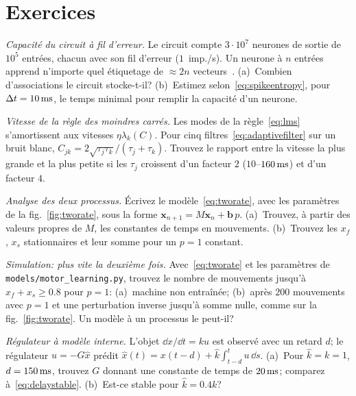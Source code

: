 \section{Exercices}

\begin{exercise}[\lvlA]
\label{ex:15:1}
\emph{Capacité du circuit à fil d'erreur.} Le circuit compte $3\cdot10^7$ neurones de sortie de $10^5$ entrées, chacun avec son fil d'erreur ($1$~imp./s). Un neurone à $n$ entrées apprend n'importe quel étiquetage de $\approx2n$ vecteurs~\cite{Cover1965}. (a)~Combien d'associations le circuit stocke-t-il? (b)~Estimez selon~\eqref{eq:spikeentropy}, pour $\Delta t=10\,\text{ms}$, le temps minimal pour remplir la capacité d'un neurone.
\end{exercise}

\begin{exercise}[\lvlB]
\label{ex:15:2}
\emph{Vitesse de la règle des moindres carrés.} Les modes de la règle~\eqref{eq:lms} s'amortissent aux vitesses $\eta\lambda_k(C)$. Pour cinq filtres~\eqref{eq:adaptivefilter} sur un bruit blanc, $C_{jk}=2\sqrt{\tau_j\tau_k}/(\tau_j+\tau_k)$. Trouvez le rapport entre la vitesse la plus grande et la plus petite si les $\tau_j$ croissent d'un facteur $2$ ($10$--$160\,\text{ms}$) et d'un facteur $4$.
\end{exercise}

\begin{exercise}[\lvlB]
\label{ex:15:3}
\emph{Analyse des deux processus.} Écrivez le modèle~\eqref{eq:tworate}, avec les paramètres de la fig.~\ref{fig:tworate}, sous la forme $\mathbf x_{n+1}=M\mathbf x_n+\mathbf b\,p$. (a)~Trouvez, à partir des valeurs propres de $M$, les constantes de temps en mouvements. (b)~Trouvez les $x_f$, $x_s$ stationnaires et leur somme pour un $p=1$ constant.
\end{exercise}

\begin{exercise}[\lvlB]
\label{ex:15:4}
\emph{Simulation: plus vite la deuxième fois.} Avec~\eqref{eq:tworate} et les paramètres de \texttt{models/\allowbreak motor\_learning.py}, trouvez le nombre de mouvements jusqu'à $x_f+x_s\ge0.8$ pour $p=1$: (a)~machine non entraînée; (b)~après $200$ mouvements avec $p=1$ et une perturbation inverse jusqu'à somme nulle, comme sur la fig.~\ref{fig:tworate}. Un modèle à un processus le peut-il?
\end{exercise}

\begin{exercise}[\lvlB]
\label{ex:15:5}
\emph{Régulateur à modèle interne.} L'objet $\dd x/\dd t=ku$ est observé avec un retard $d$; le régulateur $u=-G\hat x$ prédit $\hat x(t)=x(t-d)+\hat k\int_{t-d}^{t}u\,\dd s$. (a)~Pour $\hat k=k=1$, $d=150\,\text{ms}$, trouvez $G$ donnant une constante de temps de $20\,\text{ms}$; comparez à~\eqref{eq:delaystable}. (b)~Est-ce stable pour $\hat k=0.4k$?
\end{exercise}

